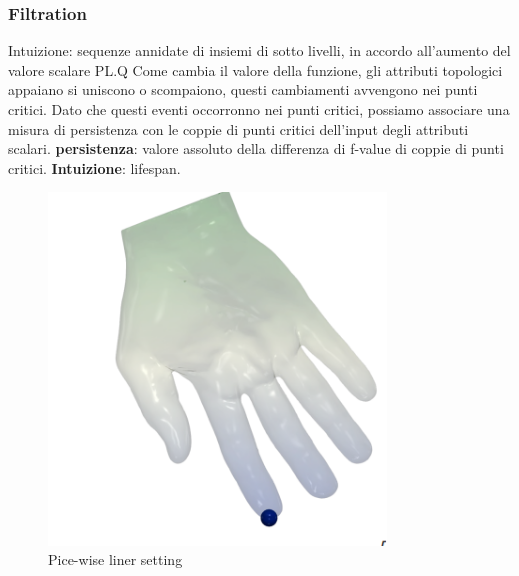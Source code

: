 \subsubsection{Filtration}
Intuizione: sequenze annidate di insiemi di sotto livelli, in accordo all'aumento del valore scalare PL.Q
Come cambia il valore della funzione, gli attributi topologici appaiano si uniscono o scompaiono, questi cambiamenti avvengono nei punti critici.
Dato che questi eventi occorronno nei punti critici, possiamo associare una misura di persistenza con le coppie di punti critici dell'input degli attributi scalari.
\textbf{persistenza}: valore assoluto della differenza di f-value  di coppie di punti critici.
\textbf{Intuizione}: lifespan.

\begin{figure}[H]
    \centering
    \includegraphics[width=0.8\textwidth]{images/Filtr.png} 
    \caption{Pice-wise liner setting}
    \label{fig:immagine}
\end{figure}
